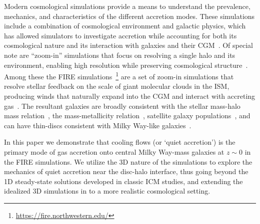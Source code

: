 \documentclass[fleqn,usenatbib]{mnras}
\begin{document}

Modern cosmological simulations provide a means to understand the prevalence, mechanics, and characteristics of the different accretion modes.
These simulations include a combination of cosmological environment and galactic physics, which has allowed simulators to investigate accretion while accounting for both its cosmological nature and its interaction with galaxies and their CGM~\citep[e.g.][]{Oppenheimer2010, Stewart2011, Fernandez2012, Ford2014, Angles-Alcazar2017, Hafen2019, Hafen2020, Ho2019, Rottgers2020, Trapp2021}.
Of special note are ``zoom-in'' simulations that focus on resolving a single halo and its environment, enabling high resolution while preserving cosmological structure~\citep[e.g.][]{Katz1993, Hopkins2014, Hopkins2018, Wang2015, Agertz2020}.
Among these the FIRE simulations~\citep{Hopkins2014, Hopkins2017}\footnote{\url{https://fire.northwestern.edu/}} are a set of zoom-in simulations that resolve stellar feedback on the scale of giant molecular clouds in the ISM, producing winds that naturally expand into the CGM and interact with accreting gas~\citep{Muratov2015, Muratov2017, Hafen2019, Hafen2020}.
The resultant galaxies are broadly consistent with the stellar mass-halo mass relation~\citep{Hopkins2017}, the mass-metallicity relation~\citep{Ma2016a}, satellite galaxy populations~\citep{Wetzel2016, Garrison-Kimmel2019a}, and can have thin-discs consistent with Milky Way-like galaxies~\citep{Garrison-Kimmel2018, El-Badry2018}.

In this paper we demonstrate that cooling flows (or `quiet accretion') is the primary mode of gas accretion onto central Milky Way-mass galaxies at $z \sim 0$ in the FIRE simulations. 
We utilize the 3D nature of the simulations to explore the mechanics of quiet accretion near the disc-halo interface, thus going beyond the 1D steady-state solutions developed in classic ICM studies, and extending the idealized 3D simulations in \cite{Stern2020} to a more realistic cosmological setting. 
\end{document}
